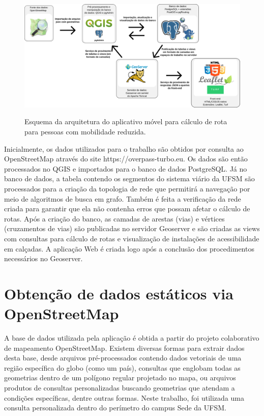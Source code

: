 \documentclass[oneside,openright,12pt]{ufsm_2015} %
\begin{document}
\begin{figure}[ht]
    \caption{Esquema da arquitetura do aplicativo móvel para cálculo de rota para pessoas com mobilidade reduzida.}
    \centering
    \includegraphics[scale=0.20]{imagens/arq_sistema.png}
    \label{arq_sistema}
\end{figure}

Inicialmente, os dados utilizados para o trabalho são obtidos por consulta ao OpenStreetMap através do site https://overpass-turbo.eu. 
Os dados são então processados no QGIS e importados para o banco de dados PostgreSQL. 
Já no banco de dados, a tabela contendo os segmentos do sistema viário da UFSM são processados para a criação da topologia de rede que permitirá a navegação por meio de algoritmos de busca em grafo.
Também é feita a verificação da rede criada para garantir que ela não contenha erros que possam afetar o cálculo de rotas. 
Após a criação do banco, as camadas de arestas (vias) e vértices (cruzamentos de vias) são publicadas no servidor Geoserver e são criadas as views com consultas para cálculo de rotas e visualização de instalações de acessibilidade em calçadas. 
A aplicação Web é criada logo após a conclusão dos procedimentos necessários no Geoserver.

\section{Obtenção de dados estáticos via OpenStreetMap}

A base de dados utilizada pela aplicação é obtida a partir do projeto colaborativo de mapeamento OpenStreetMap. 
Existem diversas formas para extrair dados desta base, desde arquivos pré-processados contendo dados vetoriais de uma região específica do globo (como um país), consultas que englobam todas as geometrias dentro de um polígono regular projetado no mapa, ou arquivos produtos de consultas personalizadas buscando geometrias que atendam a condições específicas, dentre outras formas. 
Neste trabalho, foi utilizada uma consulta personalizada dentro do perímetro do campus Sede da UFSM.
\end{document}
